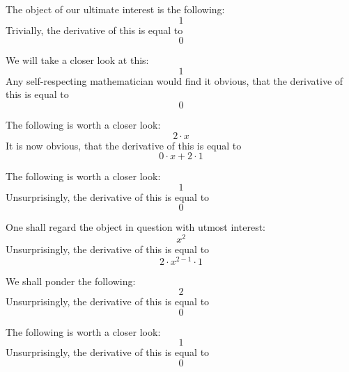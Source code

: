 \documentclass{article}
\begin{document}
The object of our ultimate interest is the following:
\begin{equation}
1 
\end{equation}
Trivially, the derivative of this is equal to
\begin{equation}
0 
\end{equation}

We will take a closer look at this:
\begin{equation}
1 
\end{equation}
Any self-respecting mathematician would find it obvious, that the derivative of this is equal to
\begin{equation}
0 
\end{equation}

The following is worth a closer look:
\begin{equation}
2 \cdot x 
\end{equation}
It is now obvious, that the derivative of this is equal to
\begin{equation}
0 \cdot x + 2 \cdot 1 
\end{equation}

The following is worth a closer look:
\begin{equation}
1 
\end{equation}
Unsurprisingly, the derivative of this is equal to
\begin{equation}
0 
\end{equation}

One shall regard the object in question with utmost interest:
\begin{equation}
x ^{2 } 
\end{equation}
Unsurprisingly, the derivative of this is equal to
\begin{equation}
2 \cdot x ^{2 - 1 } \cdot 1 
\end{equation}

We shall ponder the following:
\begin{equation}
2 
\end{equation}
Unsurprisingly, the derivative of this is equal to
\begin{equation}
0 
\end{equation}

The following is worth a closer look:
\begin{equation}
1 
\end{equation}
Unsurprisingly, the derivative of this is equal to
\begin{equation}
0 
\end{equation}
\end{document}
